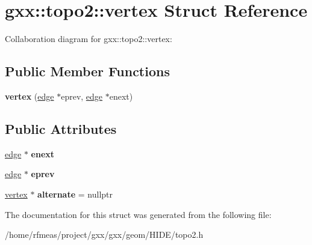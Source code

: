 \hypertarget{structgxx_1_1topo2_1_1vertex}{}\section{gxx\+:\+:topo2\+:\+:vertex Struct Reference}
\label{structgxx_1_1topo2_1_1vertex}


Collaboration diagram for gxx\+:\+:topo2\+:\+:vertex\+:
\subsection*{Public Member Functions}
\begin{DoxyCompactItemize}
\item 
{\bfseries vertex} (\hyperlink{structgxx_1_1topo2_1_1edge}{edge} $\ast$eprev, \hyperlink{structgxx_1_1topo2_1_1edge}{edge} $\ast$enext)\hypertarget{structgxx_1_1topo2_1_1vertex_a6290d007528c87525d92b4b59a046a61}{}\label{structgxx_1_1topo2_1_1vertex_a6290d007528c87525d92b4b59a046a61}

\end{DoxyCompactItemize}
\subsection*{Public Attributes}
\begin{DoxyCompactItemize}
\item 
\hyperlink{structgxx_1_1topo2_1_1edge}{edge} $\ast$ {\bfseries enext}\hypertarget{structgxx_1_1topo2_1_1vertex_ae29bf3040cbc99e5ef4b31639f91cb87}{}\label{structgxx_1_1topo2_1_1vertex_ae29bf3040cbc99e5ef4b31639f91cb87}

\item 
\hyperlink{structgxx_1_1topo2_1_1edge}{edge} $\ast$ {\bfseries eprev}\hypertarget{structgxx_1_1topo2_1_1vertex_a0e02cbadbd6da5da0ac4fd9cb001252c}{}\label{structgxx_1_1topo2_1_1vertex_a0e02cbadbd6da5da0ac4fd9cb001252c}

\item 
\hyperlink{structgxx_1_1topo2_1_1vertex}{vertex} $\ast$ {\bfseries alternate} = nullptr\hypertarget{structgxx_1_1topo2_1_1vertex_ae94412f274465991f1e38b3695148f3f}{}\label{structgxx_1_1topo2_1_1vertex_ae94412f274465991f1e38b3695148f3f}

\end{DoxyCompactItemize}


The documentation for this struct was generated from the following file\+:\begin{DoxyCompactItemize}
\item 
/home/rfmeas/project/gxx/gxx/geom/\+H\+I\+D\+E/topo2.\+h\end{DoxyCompactItemize}
